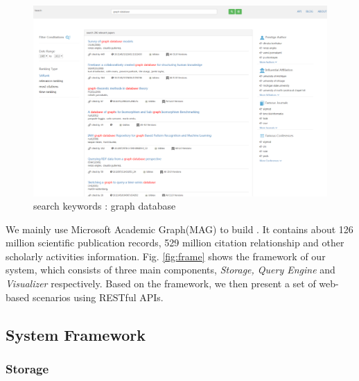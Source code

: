\begin{figure}[tp]
\centering
\includegraphics[width=\textwidth]{searchKeywords.pdf}
\caption{search keywords : graph database}
\label{fig: search keywords}
\end{figure}

\par
We mainly use Microsoft Academic Graph(MAG) to build \oursystem \cite{sinha2015overview}. It contains about 126 million scientific publication records, 529 million citation relationship and other scholarly activities information. Fig. \ref{fig:frame} shows the framework of our system, which consists of three main components, \emph{Storage, Query Engine} and \emph{Visualizer} respectively. Based on the framework, we then present a set of web-based scenarios using RESTful APIs.

\subsection{System Framework}

\subsubsection{Storage}
\par

